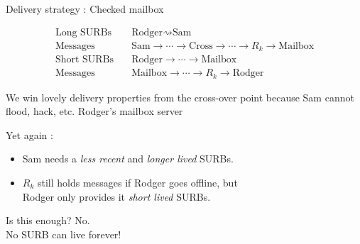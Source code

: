 \documentclass[fleqn,xcolor={usenames,dvipsnames}]{beamer}
\begin{document}
\begin{frame}[t]{Delivery strategy : Checked mailbox}

\[ \begin{aligned}
\textrm{Long SURBs}\quad & \textrm{Rodger} \rightsquigarrow \textrm{Sam} \\
\textrm{Messages}\quad & \textrm{Sam} \to \cdots \to \textrm{Cross}
  \to \cdots \to R_k \to \textrm{Mailbox} \\
\textrm{Short SURBs}\quad & \textrm{Rodger} \to \cdots \to \textrm{Mailbox} \\
\textrm{Messages}\quad & \textrm{Mailbox} \to \cdots \to R_k \to \textrm{Rodger}
\end{aligned} \]

\smallskip

We win lovely delivery properties from the cross-over point 
 \hspace*{2pt} because Sam cannot flood, hack, etc. Rodger's mailbox server

\smallskip

Yet again :
\begin{itemize}
\item Sam needs a {\em less recent} and {\em longer lived} SURBs. %
\item $R_k$ still holds messages if Rodger goes offline, but \\
 \hspace*{2pt} Rodger only provides it {\em short lived} SURBs.
\end{itemize}


\medskip
Is this enough?  No.  \\
 \hspace*{2pt} No SURB can live forever!

\end{frame}
\end{document}
